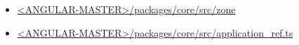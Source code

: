 

\begin{itemize}
  \item \href{https://github.com/angular/angular/tree/master/packages/core/src/zone}
        {<ANGULAR-MASTER>/packages/core/src/zone}
\end{itemize}


\begin{itemize}
  \item \href{https://github.com/angular/angular/blob/master/packages/core/src/application_ref.ts}
        {<ANGULAR-MASTER>/packages/core/src/application\_ref.ts}
\end{itemize}








